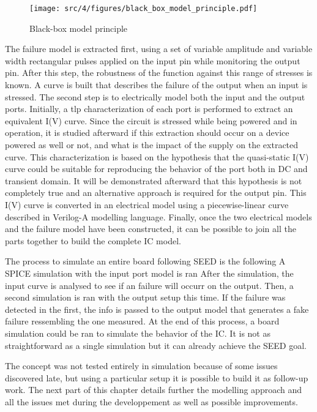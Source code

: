 \begin{figure}[!h]
  \centering
  \texttt{[image: src/4/figures/black\_box\_model\_principle.pdf]}
  \caption{Black-box model principle}
  \label{fig:black-box-principle}
\end{figure}

The failure model is extracted first, using a set of variable amplitude and variable width rectangular pulses applied on the input pin while monitoring the output pin.
After this step, the robustness of the function against this range of stresses is known.
A curve is built that describes the failure of the output when an input is stressed.
The second step is to electrically model both the input and the output ports.
Initially, a \gls{tlp} characterization of each port is performed to extract an equivalent I(V) curve.
Since the circuit is stressed while being powered and in operation, it is studied afterward if this extraction should occur on a device powered as well or not, and what is the impact of the supply on the extracted curve.
This characterization is based on the hypothesis that the quasi-static I(V) curve could be suitable for reproducing the behavior of the port both in DC and transient domain.
It will be demonstrated afterward that this hypothesis is not completely true and an alternative approach is required for the output pin.
This I(V) curve is converted in an electrical model using a piecewise-linear curve described in Verilog-A modelling language.
Finally, once the two electrical models and the failure model have been constructed, it can be possible to join all the parts together to build the complete IC model.

The process to simulate an entire board following SEED is the following
A SPICE simulation with the input port model is ran
After the simulation, the input curve is analysed to see if an failure will occurr on the output.
Then, a second simulation is ran with the output setup this time.
If the failure was detected in the first, the info is passed to the output model that generates a fake failure ressembling the one measured.
At the end of this process, a board simulation could be ran to simulate the behavior of the IC.
It is not as straightforward as a single simulation but it can already achieve the SEED goal.

The concept was not tested entirely in simulation because of some issues discovered late, but using a particular setup it is possible to build it as follow-up work.
The next part of this chapter details further the modelling approach and all the issues met during the developpement as well as possible improvements.

